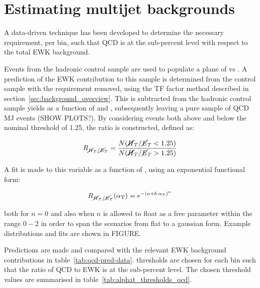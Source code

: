 \section{Estimating multijet backgrounds}  %
\label{sec:background_qcd}

A data-driven technique has been 
developed to determine the necessary \alphat requirement, per \HT bin, 
such that QCD is at the sub-percent level with respect to the total EWK 
background.

Events from the hadronic control sample are used to populate a plane of \mhtmet 
vs \alphat. A prediction of the EWK contribution to this sample is determined 
from the \mj control sample with the \mhtmet requirement removed, using the TF 
factor method described in section~\ref{sec:background_overview}. This is 
subtracted from the hadronic control sample yields as a function of \mhtmet and
\alphat, subsequently leaving a pure sample of QCD MJ events (SHOW PLOTS?).
By considering events both above and below the nominal \mhtmet threshold of
1.25, the ratio \rmhtmet is constructed, defined as:

\begin{equation}
\label{eq:rmhtmet}
R_{\cancel{H}_T / \cancel{E}_T} = \frac{N(\cancel{H}_T / \cancel{E}_T<1.25)}{N(\cancel{H}_T / \cancel{E}_T>1.25)}
\end{equation}

A fit is made to this variable as a function of \alphat, using an exponential 
functional form:

\begin{equation}
\label{eq:fit_exp}
R_{\cancel{H}_T / \cancel{E}_T}(\alpha_{\text{T}}) = e^{{-(a+b.\alpha_{\text{T}})}^n}
\end{equation}

both for $n=0$ and also when $n$ is allowed to float as a free 
parameter within the range $0-2$ in order to span the scenarios from flat to a
gaussian form. Example distributions and fits are shown in FIGURE.

Predictions are made and compared with the relevant EWK background 
contributions in table~\ref{tab:qcd-pred-data}. \alphat thresholds are chosen 
for each \HT bin such that the ratio of QCD to EWK is at the sub-percent level. 
The chosen \alphat threshold values are summarised in
table~\ref{tab:alphat_thresholds_qcd}.

